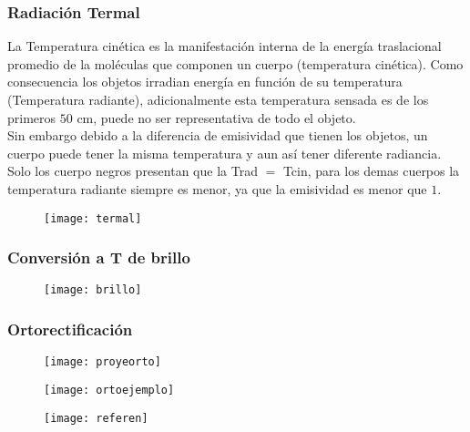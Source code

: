 \documentclass[14pt]{beamer}
\begin{document}
\begin{frame}
\frametitle{Radiación Termal}
\small{La Temperatura cinética es la manifestación interna de la energía traslacional promedio de la moléculas que componen un cuerpo (temperatura cinética). Como consecuencia  los objetos irradian energía en función de su temperatura (Temperatura radiante), adicionalmente esta temperatura sensada es de los primeros $50$ cm, puede no ser representativa de todo el objeto.\\
Sin embargo debido a la diferencia de emisividad que tienen los objetos, un cuerpo puede tener la misma temperatura y aun así tener diferente radiancia. Solo los cuerpo negros presentan que la Trad $=$ Tcin, para los demas cuerpos la temperatura radiante siempre es menor, ya que la emisividad es menor que $1$.}
\begin{figure}
    \centering
    \texttt{[image: termal]}
  \end{figure}
\end{frame}
\begin{frame}
\frametitle{Conversión a T de brillo }
  \begin{figure}
    \centering
    \texttt{[image: brillo]}
  \end{figure}
\end{frame}
\begin{frame}
\frametitle{Ortorectificación}
\scriptsize{}
  \begin{figure}
    \centering
    \texttt{[image: proyeorto]}
  \end{figure}
\end{frame}
\begin{frame}
\scriptsize{}
  \begin{figure}
    \centering
    \texttt{[image: ortoejemplo]}
  \end{figure}
\end{frame}
\begin{frame}
\scriptsize{}
  \begin{figure}
    \centering
    \texttt{[image: referen]}
  \end{figure}
\end{frame}
\end{document}
